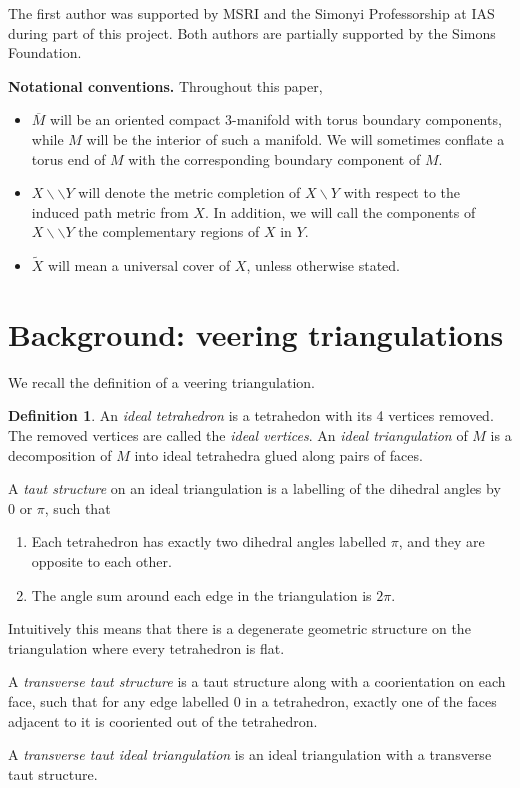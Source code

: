 \documentclass[12pt]{amsart}
\theoremstyle{definition}
\newtheorem{defn}[thm]{Definition}
\numberwithin{equation}{section}
\begin{document}
The first author was supported by MSRI and the Simonyi Professorship at IAS during part of this project. Both authors are partially supported by the Simons Foundation.

{\bf Notational conventions.} Throughout this paper, 
\begin{itemize}
    \item $\overline{M}$ will be an oriented compact 3-manifold with torus boundary components, while $M$ will be the interior of such a manifold. We will sometimes conflate a torus end of $M$ with the corresponding boundary component of $M$.
    \item $X \backslash \backslash Y$ will denote the metric completion of $X \backslash Y$ with respect to the induced path metric from $X$. In addition, we will call the components of $X \backslash \backslash Y$ the complementary regions of $X$ in $Y$.
    \item $\widetilde{X}$ will mean a universal cover of $X$, unless otherwise stated.
\end{itemize}

\section{Background: veering triangulations} \label{sec:veertri}

We recall the definition of a veering triangulation.

\begin{defn} \label{defn:tautstructure}
An \textit{ideal tetrahedron} is a tetrahedon with its 4 vertices removed. The removed vertices are called the \textit{ideal vertices}. An \textit{ideal triangulation} of $M$ is a decomposition of $M$ into ideal tetrahedra glued along pairs of faces.

A \textit{taut structure} on an ideal triangulation is a labelling of the dihedral angles by $0$ or $\pi$, such that 
\begin{enumerate}
    \item Each tetrahedron has exactly two dihedral angles labelled $\pi$, and they are opposite to each other.
    \item The angle sum around each edge in the triangulation is $2\pi$.
\end{enumerate}

Intuitively this means that there is a degenerate geometric structure on the triangulation where every tetrahedron is flat.

A \textit{transverse taut structure} is a taut structure along with a coorientation on each face, such that for any edge labelled $0$ in a tetrahedron, exactly one of the faces adjacent to it is cooriented out of the tetrahedron.

A \textit{transverse taut ideal triangulation} is an ideal triangulation with a transverse taut structure.
\end{defn}
\end{document}
